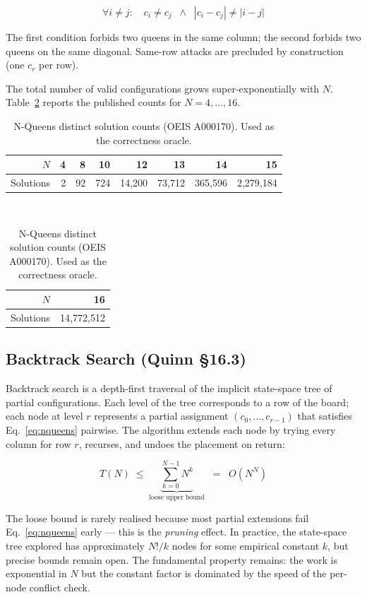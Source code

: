 \documentclass[12pt, letterpaper]{article}
\begin{document}
\begin{equation}
    \forall i \neq j: \quad c_i \neq c_j \;\;\wedge\;\; |c_i - c_j| \neq |i - j|
    \label{eq:nqueens}
\end{equation}

The first condition forbids two queens in the same column; the second forbids two queens on the same diagonal. Same-row attacks are precluded by construction (one $c_r$ per row).

The total number of valid configurations grows super-exponentially with $N$. Table~\ref{tab:oeis} reports the published counts for $N = 4, \ldots, 16$.

\begin{table}[H]
\centering
\caption{N-Queens distinct solution counts (OEIS A000170). Used as the correctness oracle.}
\begin{tabular}{@{}rrrrrrrr@{}}
\toprule
$N$ & 4 & 8 & 10 & 12 & 13 & 14 & 15 \\
\midrule
Solutions & 2 & 92 & 724 & 14{,}200 & 73{,}712 & 365{,}596 & 2{,}279{,}184 \\
\bottomrule
\end{tabular}
\\[0.6em]
\begin{tabular}{@{}rr@{}}
\toprule
$N$ & 16 \\
\midrule
Solutions & 14{,}772{,}512 \\
\bottomrule
\end{tabular}
\label{tab:oeis}
\end{table}

\subsection{Backtrack Search (Quinn \S 16.3)}

Backtrack search is a depth-first traversal of the implicit state-space tree of partial configurations. Each level of the tree corresponds to a row of the board; each node at level $r$ represents a partial assignment $(c_0, \ldots, c_{r-1})$ that satisfies Eq.~\eqref{eq:nqueens} pairwise. The algorithm extends each node by trying every column for row $r$, recurses, and undoes the placement on return:

\begin{equation}
    T(N) \;\leq\; \underbrace{\sum_{k=0}^{N-1} N^k}_{\text{loose upper bound}}
    \;\;=\;\; O(N^N)
    \label{eq:naive_complexity}
\end{equation}

The loose bound is rarely realised because most partial extensions fail Eq.~\eqref{eq:nqueens} early --- this is the \emph{pruning} effect. In practice, the state-space tree explored has approximately $N!/k$ nodes for some empirical constant $k$, but precise bounds remain open. The fundamental property remains: the work is exponential in $N$ but the constant factor is dominated by the speed of the per-node conflict check.
\end{document}
